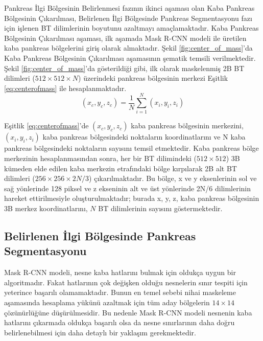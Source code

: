 Pankreas İlgi Bölgesinin Belirlenmesi fazının ikinci aşaması olan Kaba Pankreas Bölgesinin Çıkarılması, Belirlenen İlgi Bölgesinde Pankreas Segmentasyonu fazı için işlenen BT dilimlerinin boyutunu azaltmayı amaçlamaktadır. Kaba Pankreas Bölgesinin Çıkarılması aşaması, ilk aşamada Mask R-CNN modeli ile üretilen kaba pankreas bölgelerini giriş olarak almaktadır. Şekil \ref{fig:center_of_mass}’da Kaba Pankreas Bölgesinin Çıkarılması aşamasının şematik temsili verilmektedir. Şekil \ref{fig:center_of_mass}’da gösterildiği gibi, ilk olarak maskelenmiş 2B BT dilimleri ($512 \times 512 \times N$) üzerindeki pankreas bölgesinin merkezi Eşitlik \ref{eq:centerofmass} ile hesaplanmaktadır.
\begin{equation}
	\label{eq:centerofmass}
	\left(x_{c}, y_{c}, z_{c}\right)=\frac{1}{N} \sum_{i=1}^{N}\left(x_{i}, y_{i}, z_{i}\right)
\end{equation}

Eşitlik \ref{eq:centerofmass}’de $\left(x_{c}, y_{c}, z_{c}\right)$ kaba pankreas bölgesinin merkezini, $\left(x_{i}, y_{i}, z_{i}\right)$ kaba pankreas bölgesindeki noktaların koordinatlarını ve N kaba pankreas bölgesindeki noktaların sayısını temsil etmektedir. Kaba pankreas bölge merkezinin hesaplanmasından sonra, her bir BT dilimindeki ($512 \times 512$) 3B kümeden elde edilen kaba merkezin etrafındaki bölge kırpılarak 2B alt BT dilimleri ($256 \times 256 \times 2N / 3$) çıkarılmaktadır. Bu bölge, x ve y eksenlerinin sol ve sağ yönlerinde 128 piksel ve z ekseninin alt ve üst yönlerinde 2N/6 dilimlerinin hareket ettirilmesiyle oluşturulmaktadır; burada x, y, z, kaba pankreas bölgesinin 3B merkez koordinatlarını, $N$ BT dilimlerinin sayısını göstermektedir.

\subsection{Belirlenen İlgi Bölgesinde Pankreas Segmentasyonu}
Mask R-CNN modeli, nesne kaba hatlarını bulmak için oldukça uygun bir algoritmadır. Fakat hatlarının çok değişken olduğu nesnelerin sınır tespiti için yeterince başarılı olamamaktadır. Bunun en temel sebebi nihai maskeleme aşamasında hesaplama yükünü azaltmak için tüm aday bölgelerin $14 \times 14$ çözünürlüğüne düşürülmesidir. Bu nedenle Mask R-CNN modeli nesnenin kaba hatlarını çıkarmada oldukça başarılı olsa da nesne sınırlarının daha doğru belirlenebilmesi için daha detaylı bir yaklaşım gerekmektedir.


